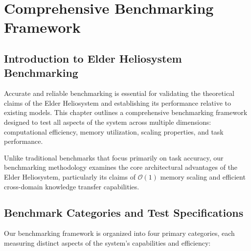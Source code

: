 \chapter{Comprehensive Benchmarking Framework}

\section{Introduction to Elder Heliosystem Benchmarking}

Accurate and reliable benchmarking is essential for validating the theoretical claims of the Elder Heliosystem and establishing its performance relative to existing models. This chapter outlines a comprehensive benchmarking framework designed to test all aspects of the system across multiple dimensions: computational efficiency, memory utilization, scaling properties, and task performance. 

Unlike traditional benchmarks that focus primarily on task accuracy, our benchmarking methodology examines the core architectural advantages of the Elder Heliosystem, particularly its claims of $\mathcal{O}(1)$ memory scaling and efficient cross-domain knowledge transfer capabilities.

\section{Benchmark Categories and Test Specifications}

Our benchmarking framework is organized into four primary categories, each measuring distinct aspects of the system's capabilities and efficiency:

